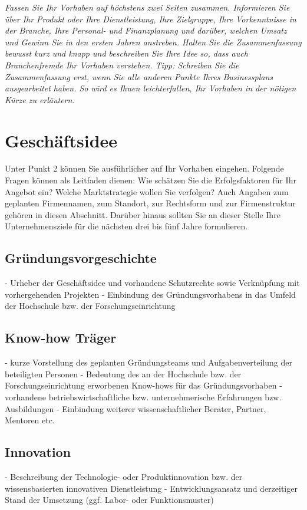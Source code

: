 \documentclass[12pt, a4paper]{article} %
\begin{document}
\emph{Fassen Sie Ihr Vorhaben auf höchstens zwei Seiten zusammen. Informieren Sie über Ihr Produkt oder Ihre Dienstleistung, Ihre Zielgruppe, Ihre Vorkenntnisse in der Branche, Ihre Personal- und Finanzplanung und darüber, welchen Umsatz und Gewinn Sie in den ersten Jahren anstreben. Halten Sie die Zusammenfassung bewusst kurz und knapp und beschreiben Sie Ihre Idee so, dass auch Branchenfremde Ihr Vorhaben verstehen. Tipp: Schreiben Sie die Zusammenfassung erst, wenn Sie alle anderen Punkte Ihres Businessplans ausgearbeitet haben. So wird es Ihnen leichterfallen, Ihr Vorhaben in der nötigen Kürze zu erläutern.}

\newpage


\section{Geschäftsidee}

Unter Punkt 2 können Sie ausführlicher auf Ihr Vorhaben eingehen. Folgende Fragen können als Leitfaden dienen: Wie schätzen Sie die Erfolgsfaktoren für Ihr Angebot ein? Welche Marktstrategie wollen Sie verfolgen? Auch Angaben zum geplanten Firmennamen, zum Standort, zur Rechtsform und zur Firmenstruktur gehören in diesen Abschnitt. Darüber hinaus sollten Sie an dieser Stelle Ihre Unternehmensziele für die nächsten drei bis fünf Jahre formulieren.



\subsection{Gründungsvorgeschichte}

- Urheber der Geschäftsidee und vorhandene Schutzrechte sowie Verknüpfung mit vorhergehenden Projekten
- Einbindung des Gründungsvorhabens in das Umfeld der Hochschule bzw. der Forschungseinrichtung 

\subsection{Know-how Träger}
- kurze Vorstellung des geplanten Gründungsteams und Aufgabenverteilung der beteiligten Personen
- Bedeutung des an der Hochschule bzw. der Forschungseinrichtung erworbenen Know-hows für das   
  Gründungsvorhaben
- vorhandene betriebswirtschaftliche bzw. unternehmerische Erfahrungen bzw. Ausbildungen
- Einbindung weiterer wissenschaftlicher Berater, Partner, Mentoren etc.
\subsection{Innovation}
- Beschreibung der Technologie- oder Produktinnovation bzw. der wissensbasierten innovativen Dienstleistung
- Entwicklungsansatz und derzeitiger Stand der Umsetzung (ggf. Labor- oder Funktionsmuster)
\end{document}
